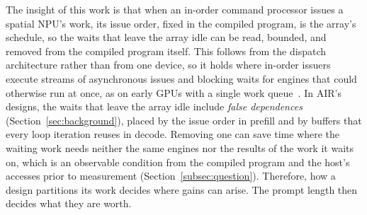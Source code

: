 The insight of this work is that when an in-order command processor issues a spatial NPU's work, its issue order, fixed in the compiled program, is the array's schedule, so the waits that leave the array idle can be read, bounded, and removed from the compiled program itself.
This follows from the dispatch architecture rather than from one device, so it holds where in-order issuers execute streams of asynchronous issues and blocking waits for engines that could otherwise run at once, as on early GPUs with a single work queue~\citep{rennich2012streams}.
In AIR's designs, the waits that leave the array idle include \emph{false dependences} (Section~\ref{sec:background}), placed by the issue order in prefill and by buffers that every loop iteration reuses in decode.
Removing one can save time where the waiting work needs neither the same engines nor the results of the work it waits on, which is an observable condition from the compiled program and the host's accesses prior to measurement (Section~\ref{subsec:question}).
Therefore, how a design partitions its work decides where gains can arise.
The prompt length then decides what they are worth.

